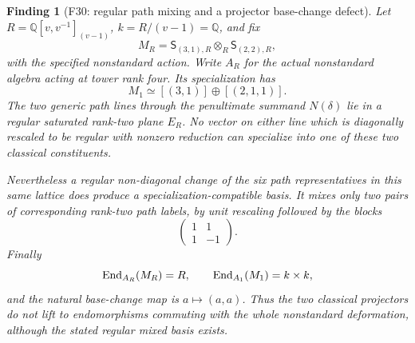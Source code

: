 \documentclass[11pt,a4paper]{article}
\newcommand{\Q}{\mathbb Q}\newcommand{\Z}{\mathbb Z}\newcommand{\C}{\mathbb C}\newcommand{\N}{\mathbb N}\newcommand{\F}{\mathbb F}
\newcommand{\fid}[1]{\textsf{#1}}\newcommand{\gate}[1]{\textsf{#1}}
\theoremstyle{named}\newtheorem{finding}{Finding}[section]
\theoremstyle{definition}\newtheorem{definition}[finding]{Definition}
\theoremstyle{remark}\newtheorem{remark}[finding]{Remark}
\begin{document}
\begin{finding}[\fid{F30}: regular path mixing and a projector base-change defect]\label{f:tower}
Let $R=\Q[v,v^{-1}]_{(v-1)}$, $k=R/(v-1)=\Q$, and fix
\[
 M_R=\mathsf S_{(3,1),R}\otimes_R\mathsf S_{(2,2),R},
\]
with the specified nonstandard action. Write $A_R$ for the actual
nonstandard algebra acting at tower rank four. Its specialization has
\[
 M_1\simeq[(3,1)]\oplus[(2,1,1)].
\]
The two generic path lines through the penultimate summand $N(\delta)$
lie in a regular saturated rank-two plane $E_R$. No vector on either
line which is diagonally rescaled to be regular with nonzero reduction
can specialize into one of these two classical constituents.

Nevertheless a regular non-diagonal change of the six path representatives
in this same lattice does produce a specialization-compatible basis.
It mixes only two pairs of corresponding rank-two path labels, by
unit rescaling followed by the blocks
\[
 \begin{pmatrix}1&1\\1&-1\end{pmatrix}.
\]
Finally
\[
 \operatorname{End}_{A_R}(M_R)=R,\qquad \operatorname{End}_{A_1}(M_1)=k\times k,
\]
and the natural base-change map is $a\mapsto(a,a)$. Thus the two
classical projectors do not lift to endomorphisms commuting with the
whole nonstandard deformation, although the stated regular mixed basis
exists.
\end{finding}
\end{document}
